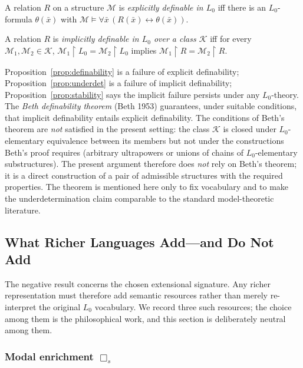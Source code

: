\begin{definition}
A relation $R$ on a structure $\mathcal M$ is \emph{explicitly
definable in $L_0$} iff there is an $L_0$-formula $\theta(\bar x)$
with $\mathcal M\models\forall\bar x\,(R(\bar x)\leftrightarrow\theta(\bar x))$.
\end{definition}

\begin{definition}
A relation $R$ is \emph{implicitly definable in $L_0$ over a class
$\mathcal K$} iff for every $\mathcal M_1,\mathcal M_2\in\mathcal K$,
$\mathcal M_1\!\upharpoonright L_0 = \mathcal M_2\!\upharpoonright L_0$
implies $\mathcal M_1\!\upharpoonright R = \mathcal M_2\!\upharpoonright R$.
\end{definition}

Proposition~\ref{prop:definability} is a failure of explicit
definability; Proposition~\ref{prop:underdet} is a failure of
implicit definability; Proposition~\ref{prop:stability} says the
implicit failure persists under any $L_0$-theory. The
\emph{Beth definability theorem} (Beth 1953) guarantees, under
suitable conditions, that implicit definability entails explicit
definability. The conditions of Beth's theorem are
\emph{not} satisfied in the present setting: the class
$\mathcal K$ is closed under $L_0$-elementary equivalence between
its members but not under the constructions Beth's proof requires
(arbitrary ultrapowers or unions of chains of $L_0$-elementary
substructures). The present argument therefore does \emph{not} rely
on Beth's theorem; it is a direct construction of a pair of
admissible structures with the required properties. The theorem is
mentioned here only to fix vocabulary and to make the
underdetermination claim comparable to the standard model-theoretic
literature.

\subsection{What Richer Languages Add---and Do Not Add}
\label{sec:richer-languages}

The negative result concerns the chosen extensional signature. Any
richer representation must therefore add semantic resources rather
than merely re-interpret the original $L_0$ vocabulary. We record
three such resources; the choice among them is the philosophical
work, and this section is deliberately neutral among them.

\subsubsection{Modal enrichment $\Box_s$}
\label{sec:modal-enrichment}

